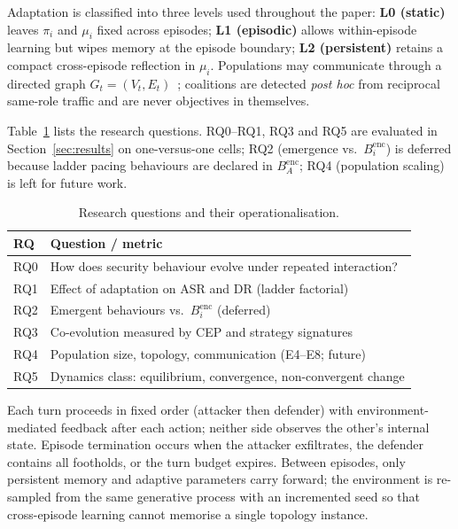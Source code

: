 Adaptation is classified into three levels used throughout the paper:
\textbf{L0 (static)} leaves $\pi_i$ and $\mu_i$ fixed across episodes;
\textbf{L1 (episodic)} allows within-episode learning but wipes memory at
the episode boundary; \textbf{L2 (persistent)} retains a compact
cross-episode reflection in $\mu_i$. Populations may communicate through a
directed graph $G_t=(V_t,E_t)$~\cite{wu2023autogen,li2023camel}; coalitions are
detected \emph{post hoc} from reciprocal same-role traffic and are never
objectives in themselves.

Table~\ref{tab:rq} lists the research questions. RQ0--RQ1, RQ3 and RQ5 are
evaluated in Section~\ref{sec:results} on one-versus-one cells; RQ2 (emergence
vs.\ $B_i^{\mathrm{enc}}$) is deferred because ladder pacing behaviours are
declared in $B_A^{\mathrm{enc}}$; RQ4 (population scaling) is left for future
work.

\begin{table}[!t]
\caption{Research questions and their operationalisation.}
\label{tab:rq}
\centering
\setlength{\tabcolsep}{3pt}
\small
\begin{tabularx}{\columnwidth}{@{}lX@{}}
\toprule
\textbf{RQ} & \textbf{Question / metric} \\
\midrule
RQ0 & How does security behaviour evolve under repeated interaction? \\
RQ1 & Effect of adaptation on ASR and DR (ladder factorial) \\
RQ2 & Emergent behaviours vs.\ $B_i^{\mathrm{enc}}$ (deferred) \\
RQ3 & Co-evolution measured by CEP and strategy signatures \\
RQ4 & Population size, topology, communication (E4--E8; future) \\
RQ5 & Dynamics class: equilibrium, convergence, non-convergent change \\
\bottomrule
\end{tabularx}
\end{table}

Each turn proceeds in fixed order (attacker then defender) with environment-mediated
feedback after each action; neither side observes the other's internal state. Episode termination
occurs when the attacker exfiltrates, the defender contains all footholds,
or the turn budget expires. Between episodes, only persistent memory and
adaptive parameters carry forward; the environment is re-sampled from the
same generative process with an incremented seed so that cross-episode
learning cannot memorise a single topology instance.
